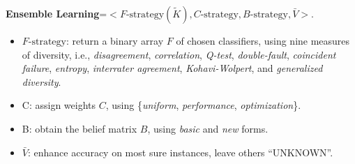 {\bf Ensemble Learning}=$<F\text{-strategy}(\tilde{K}), C\text{-strategy}, B\text{-strategy}, \bar{V}>$.


\begin{itemize}[noitemsep,topsep=1pt]
  \itemsep0.35em 
  \item $F\text{-strategy}$: return a binary array $F$ of chosen classifiers,  using nine measures of diversity, i.e., \emph{disagreement}, \emph{correlation}, \emph{Q-test}, \emph{double-fault}, \emph{coincident failure}, \emph{entropy}, \emph{interrater agreement}, \emph{Kohavi-Wolpert}, and \emph{generalized diversity}. 
  \item C: assign weights $C$, using \{\emph{uniform}, \emph{performance}, \emph{optimization}\}.
  \item B: obtain the belief matrix $B$, using \emph{basic} and \emph{new} forms.
  \item $\bar{V}$: enhance accuracy on most sure instances, leave others ``UNKNOWN''.
\end{itemize}


